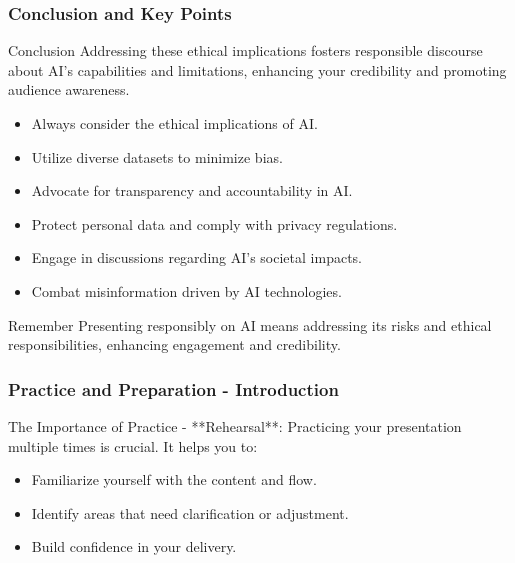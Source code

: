 \documentclass[aspectratio=169]{beamer}
\begin{document}
\begin{frame}[fragile]
    \frametitle{Conclusion and Key Points}
    \begin{block}{Conclusion}
        Addressing these ethical implications fosters responsible discourse about AI's capabilities and limitations, enhancing your credibility and promoting audience awareness.
    \end{block}
    
    \begin{itemize}
        \item Always consider the ethical implications of AI.
        \item Utilize diverse datasets to minimize bias.
        \item Advocate for transparency and accountability in AI.
        \item Protect personal data and comply with privacy regulations.
        \item Engage in discussions regarding AI's societal impacts.
        \item Combat misinformation driven by AI technologies.
    \end{itemize}

    \begin{block}{Remember}
        Presenting responsibly on AI means addressing its risks and ethical responsibilities, enhancing engagement and credibility.
    \end{block}
\end{frame}

\begin{frame}[fragile]
    \frametitle{Practice and Preparation - Introduction}
    \begin{block}{The Importance of Practice}
        - **Rehearsal**: Practicing your presentation multiple times is crucial. It helps you to:
        \begin{itemize}
            \item Familiarize yourself with the content and flow.
            \item Identify areas that need clarification or adjustment.
            \item Build confidence in your delivery.
        \end{itemize}
    \end{block}
\end{frame}
\end{document}
